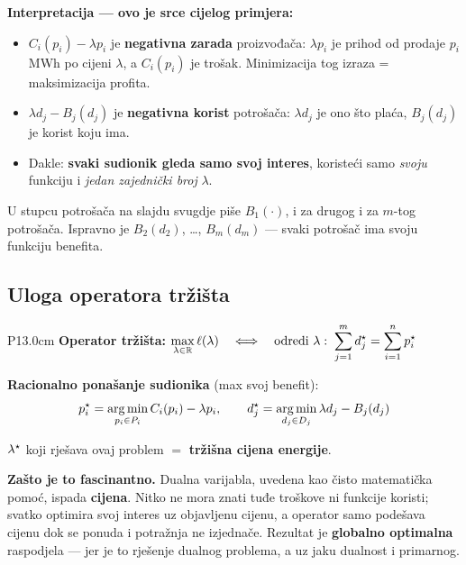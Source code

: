 \textbf{Interpretacija --- ovo je srce cijelog primjera:}

\begin{itemize}
  \item $C_i(p_i) - \lambda p_i$ je \textbf{negativna zarada} proizvođača:
        $\lambda p_i$ je prihod od prodaje $p_i$ MWh po cijeni $\lambda$, a
        $C_i(p_i)$ je trošak. Minimizacija tog izraza = maksimizacija profita.
  \item $\lambda d_j - B_j(d_j)$ je \textbf{negativna korist} potrošača:
        $\lambda d_j$ je ono što plaća, $B_j(d_j)$ je korist koju ima.
  \item Dakle: \textbf{svaki sudionik gleda samo svoj interes}, koristeći samo
        \emph{svoju} funkciju i \emph{jedan zajednički broj} $\lambda$.
\end{itemize}

\begin{napomena}
U stupcu potrošača na slajdu svugdje piše $B_1(\cdot)$, i za drugog i za
$m$-tog potrošača. Ispravno je $B_2(d_2)$, \dots, $B_m(d_m)$ --- svaki potrošač
ima svoju funkciju benefita.
\end{napomena}

\subsection{Uloga operatora tržišta}

\begin{center}
\begin{tabular}{P{13.0cm}}
\toprule
\textbf{Operator tržišta:} \quad
$\displaystyle\max_{\lambda\in\mathbb{R}}\ell(\lambda)
\quad\Longleftrightarrow\quad
\text{odredi }\lambda:\; \sum_{j=1}^{m}d_j^{\star} = \sum_{i=1}^{n}p_i^{\star}$ \\
\bottomrule
\end{tabular}
\end{center}

\textbf{Racionalno ponašanje sudionika} (max svoj benefit):
\[
p_i^{\star} = \operatorname*{arg\,min}_{p_i\in P_i} C_i(p_i) - \lambda p_i, \qquad
d_j^{\star} = \operatorname*{arg\,min}_{d_j\in D_j} \lambda d_j - B_j(d_j)
\]

\begin{teorem}
$\lambda^{\star}$ koji rješava ovaj problem $=$ \textbf{tržišna cijena energije}.
\end{teorem}

\textbf{Zašto je to fascinantno.} Dualna varijabla, uvedena kao čisto
matematička pomoć, ispada \textbf{cijena}. Nitko ne mora znati tuđe troškove ni
funkcije koristi; svatko optimira svoj interes uz objavljenu cijenu, a operator
samo podešava cijenu dok se ponuda i potražnja ne izjednače. Rezultat je
\textbf{globalno optimalna} raspodjela --- jer je to rješenje dualnog problema,
a uz jaku dualnost i primarnog.

